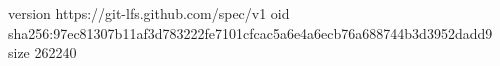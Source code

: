 version https://git-lfs.github.com/spec/v1
oid sha256:97ec81307b11af3d783222fe7101cfcac5a6e4a6ecb76a688744b3d3952dadd9
size 262240
